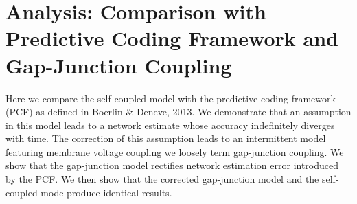 \section{Analysis: Comparison with Predictive Coding Framework and Gap-Junction Coupling}


Here we compare the self-coupled model with the predictive coding framework (PCF) as defined in Boerlin \& Deneve, 2013. We demonstrate that an assumption in this model leads to a network estimate whose accuracy indefinitely diverges with time. The correction of this assumption leads to an intermittent model featuring membrane voltage coupling we loosely term gap-junction coupling. We show that the gap-junction model rectifies network estimation error introduced by the PCF. We then show that the corrected gap-junction model and the self-coupled mode produce identical results.

